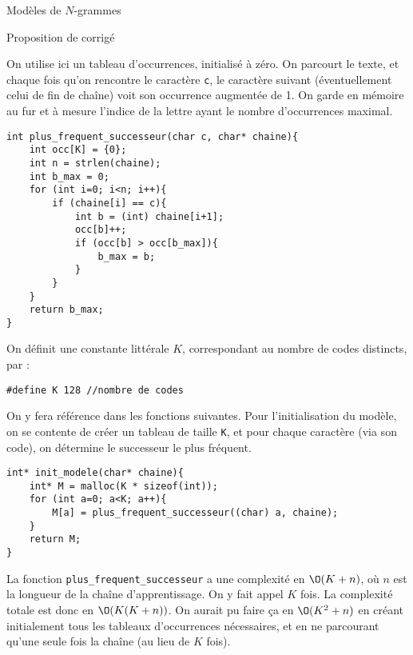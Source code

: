 \documentclass[10pt]{article}
\begin{document}
\begin{center}
\LARGE
Modèles de $N$-grammes\\
\normalsize

Proposition de corrigé
\end{center}

\begin{Exercise}
On utilise ici un tableau d'occurrences, initialisé à zéro. On parcourt le texte, et chaque fois qu'on rencontre le caractère \verb"c", le caractère suivant (éventuellement celui de fin de chaîne) voit son occurrence augmentée de 1. On garde en mémoire au fur et à mesure l'indice de la lettre ayant le nombre d'occurrences maximal.
\begin{cbox}
   \begin{verbatim}
int plus_frequent_successeur(char c, char* chaine){
    int occ[K] = {0};
    int n = strlen(chaine);
    int b_max = 0;
    for (int i=0; i<n; i++){
        if (chaine[i] == c){
            int b = (int) chaine[i+1];
            occ[b]++;
            if (occ[b] > occ[b_max]){
                b_max = b;
            }
        }
    }
    return b_max;
}
   \end{verbatim}
\end{cbox}
\end{Exercise}

\begin{Exercise}
On définit une constante littérale $K$, correspondant au nombre de codes distincts, par :
\begin{cbox}
   \begin{verbatim}
#define K 128 //nombre de codes
   \end{verbatim}
\end{cbox}
On y fera référence dans les fonctions suivantes. Pour l'initialisation du modèle, on se contente de créer un tableau de taille \verb"K", et pour chaque caractère (via son code), on détermine le successeur le plus fréquent.
\begin{cbox}
   \begin{verbatim}
int* init_modele(char* chaine){
    int* M = malloc(K * sizeof(int));
    for (int a=0; a<K; a++){
        M[a] = plus_frequent_successeur((char) a, chaine);
    }
    return M;
}
   \end{verbatim}
\end{cbox}
\end{Exercise}

\begin{Exercise}
La fonction \verb"plus_frequent_successeur" a une complexité en $\O(K + n)$, où $n$ est la longueur de la chaîne d'apprentissage. On y fait appel $K$ fois. La complexité totale est donc en $\O(K(K + n))$. On aurait pu faire ça en $\O(K^2 + n)$ en créant initialement tous les tableaux d'occurrences nécessaires, et en ne parcourant qu'une seule fois la chaîne (au lieu de $K$ fois).
\end{Exercise}
\end{document}

